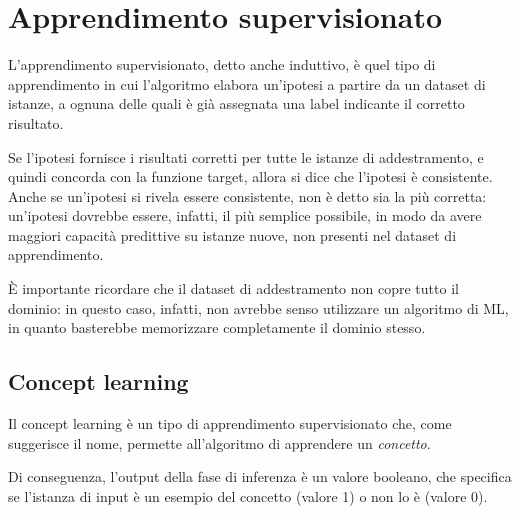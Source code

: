 \chapter{Apprendimento supervisionato}
L'apprendimento supervisionato, detto anche induttivo, è quel tipo di
apprendimento in cui l'algoritmo elabora un'ipotesi a partire da un dataset di
istanze, a ognuna delle quali è già assegnata una label indicante il corretto
risultato.

Se l'ipotesi fornisce i risultati corretti per tutte le istanze di
addestramento, e quindi concorda con la funzione target, allora si dice che
l'ipotesi è consistente. 
Anche se un'ipotesi si rivela essere consistente, non è detto sia la più
corretta: un'ipotesi dovrebbe essere, infatti, il più semplice possibile, in
modo da avere maggiori capacità predittive su istanze nuove, non presenti nel
dataset di apprendimento.

È importante ricordare che il dataset di addestramento non copre tutto il
dominio: in questo caso, infatti, non avrebbe senso utilizzare un algoritmo di
ML, in quanto basterebbe memorizzare completamente il dominio stesso.

\section{Concept learning}
Il concept learning è un tipo di apprendimento supervisionato che, come
suggerisce il nome, permette all'algoritmo di apprendere un \textit{concetto}.

Di conseguenza, l'output della fase di inferenza è un valore booleano, che
specifica se l'istanza di input è un esempio del concetto (valore 1) o non lo è
(valore 0).

